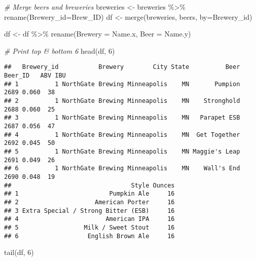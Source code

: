\documentclass[
]{article}
\newenvironment{Shaded}{\begin{snugshade}}{\end{snugshade}}
\newcommand{\AttributeTok}[1]{\textcolor[rgb]{0.77,0.63,0.00}{#1}}
\newcommand{\CommentTok}[1]{\textcolor[rgb]{0.56,0.35,0.01}{\textit{#1}}}
\newcommand{\DecValTok}[1]{\textcolor[rgb]{0.00,0.00,0.81}{#1}}
\newcommand{\FunctionTok}[1]{\textcolor[rgb]{0.00,0.00,0.00}{#1}}
\newcommand{\NormalTok}[1]{#1}
\newcommand{\OtherTok}[1]{\textcolor[rgb]{0.56,0.35,0.01}{#1}}
\newcommand{\SpecialCharTok}[1]{\textcolor[rgb]{0.00,0.00,0.00}{#1}}
\newcommand{\StringTok}[1]{\textcolor[rgb]{0.31,0.60,0.02}{#1}}
\begin{document}
\begin{Shaded}
\begin{Highlighting}[]
\CommentTok{\# Merge beers and breweries}
\NormalTok{breweries }\OtherTok{\textless{}{-}}\NormalTok{ breweries }\SpecialCharTok{\%\textgreater{}\%} \FunctionTok{rename}\NormalTok{(}\AttributeTok{Brewery\_id=}\NormalTok{Brew\_ID)}
\NormalTok{df }\OtherTok{\textless{}{-}} \FunctionTok{merge}\NormalTok{(breweries, beers, }\AttributeTok{by=}\StringTok{\textquotesingle{}Brewery\_id\textquotesingle{}}\NormalTok{)}

\NormalTok{df }\OtherTok{\textless{}{-}}\NormalTok{ df }\SpecialCharTok{\%\textgreater{}\%} \FunctionTok{rename}\NormalTok{(}\AttributeTok{Brewery =}\NormalTok{ Name.x, }\AttributeTok{Beer =}\NormalTok{ Name.y)}

\CommentTok{\# Print top \& bottom 6}
\FunctionTok{head}\NormalTok{(df, }\DecValTok{6}\NormalTok{)}
\end{Highlighting}
\end{Shaded}

\begin{verbatim}
##   Brewery_id           Brewery        City State          Beer Beer_ID   ABV IBU
## 1          1 NorthGate Brewing Minneapolis    MN       Pumpion    2689 0.060  38
## 2          1 NorthGate Brewing Minneapolis    MN    Stronghold    2688 0.060  25
## 3          1 NorthGate Brewing Minneapolis    MN   Parapet ESB    2687 0.056  47
## 4          1 NorthGate Brewing Minneapolis    MN  Get Together    2692 0.045  50
## 5          1 NorthGate Brewing Minneapolis    MN Maggie's Leap    2691 0.049  26
## 6          1 NorthGate Brewing Minneapolis    MN    Wall's End    2690 0.048  19
##                                 Style Ounces
## 1                         Pumpkin Ale     16
## 2                     American Porter     16
## 3 Extra Special / Strong Bitter (ESB)     16
## 4                        American IPA     16
## 5                  Milk / Sweet Stout     16
## 6                   English Brown Ale     16
\end{verbatim}

\begin{Shaded}
\begin{Highlighting}[]
\FunctionTok{tail}\NormalTok{(df, }\DecValTok{6}\NormalTok{)}
\end{Highlighting}
\end{Shaded}
\end{document}
